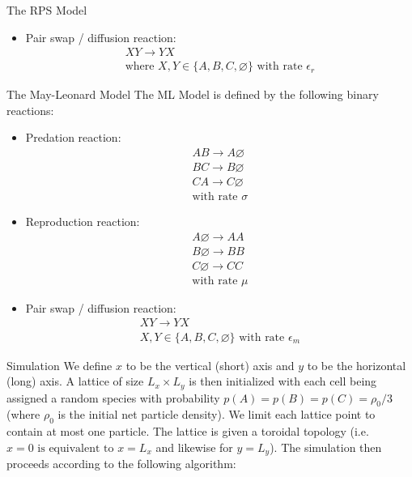 \documentclass{beamer}
\begin{document}
\begin{frame}{}
\begin{textblock}{0.32}
\begin{block}{\centering The RPS Model}
\begin{itemize}
            \item Pair swap / diffusion reaction:
            \begin{gather*}
                XY \rightarrow YX \\
                \text{where }X, Y \in \{A, B, C, \varnothing\} \text{ with rate } \epsilon_r
            \end{gather*}
        \end{itemize}
    \end{block}
    \begin{block}{\centering The May-Leonard Model}
        The ML Model is defined by the following binary reactions:
        \begin{itemize}
            \item Predation reaction:
            \begin{gather*}
                AB \rightarrow A \varnothing \\
                BC \rightarrow B \varnothing \\
                CA \rightarrow C \varnothing \\            
                \text{with rate } \sigma
            \end{gather*}
            \item Reproduction reaction:
            \begin{gather*}
                A \varnothing \rightarrow AA\\
                B \varnothing \rightarrow BB\\
                C \varnothing \rightarrow CC\\            
                \text{with rate } \mu
            \end{gather*}
            \item Pair swap / diffusion reaction:
            \begin{gather*}
                XY \rightarrow YX \\
                X, Y \in \{A, B, C, \varnothing\} \text{ with rate } \epsilon_m
            \end{gather*}
        \end{itemize}

    \end{block}
    \begin{block}{\centering Simulation}
        We define $x$ to be the vertical (short) axis and $y$ to be the horizontal
        (long) axis. A lattice of size $L_x \times L_y$ is then initialized with each cell 
        being assigned a random species with probability $p (A) = p (B) = p (C) = {\rho_0}/{3}$ (where $\rho_0$ is the 
        initial net particle density). We limit each lattice point to contain at most
        one particle.
        The lattice is given a toroidal topology (i.e. $x=0 \text{ is equivalent 
        to } x = L_x$ and likewise for $y = L_y$). The simulation then proceeds according 
        to the following algorithm:


\end{block}
\end{textblock}
\end{frame}
\end{document}
